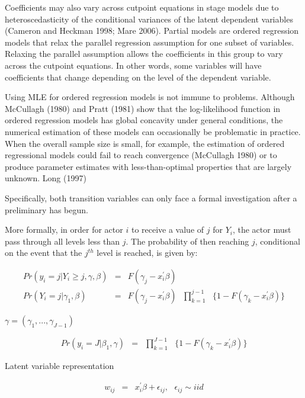 Coefficients may also vary across cutpoint equations in stage models due to heteroscedasticity of the conditional variances of the latent dependent variables (Cameron and Heckman 1998; Mare 2006). Partial models are ordered regression models that relax the parallel regression assumption for one subset of variables. Relaxing the parallel assumption allows the coefficients in this group to vary across the cutpoint equations. In other words, some variables will have coefficients that change depending on the level of the dependent variable.

Using MLE for ordered regression models is not immune to problems. Although McCullagh (1980) and Pratt (1981) show that the log-likelihood function in ordered regression models has global concavity under general conditions, the numerical estimation of these models can occasionally be problematic in practice. When the overall sample size is small, for example, the estimation of ordered regressional models could fail to reach convergence (McCullagh 1980) or to produce parameter estimates with less-than-optimal properties that are largely unknown. Long (1997)

Specifically, both transition variables can only face a formal investigation after a preliminary has begun.

More formally, in order for actor $i$ to receive a value of $j$ for $Y_{i}$, the actor must pass through all levels less than $j$. The probability of then reaching $j$, conditional on the event that the $j^{th}$ level is reached, is given by:

\begin{eqnarray}
	Pr(y_{i}={j} | Y_{i} \geq {j}, \gamma, \beta) &=& F(\gamma_{j} - x_{i}^{'}\beta) \nonumber \\
	Pr(Y_{i}={j}|\gamma_{1},\beta) &=& F(\gamma_{j} - x_{i}^{'}\beta)\text{ }\prod^{j-1}_{k=1}\text{ }\{1-F(\gamma_{k}-x_{i}^{'}\beta)\} \nonumber
\end{eqnarray}

$\gamma = (\gamma_{1},...,\gamma_{J-1})$

\begin{eqnarray}
	Pr(y_{i}=J|\beta_{1},\gamma) &=&\text{}\prod^{J-1}_{k=1}\text{ }\{1-F(\gamma_{k}-x_{i}^{'}\beta)\} \nonumber
\end{eqnarray}

Latent variable representation

\begin{eqnarray}
	w_{ij} &=& x_{i}^{'}\beta+\epsilon_{ij},\text{ }\epsilon_{ij} \sim iid \nonumber
\end{eqnarray}

